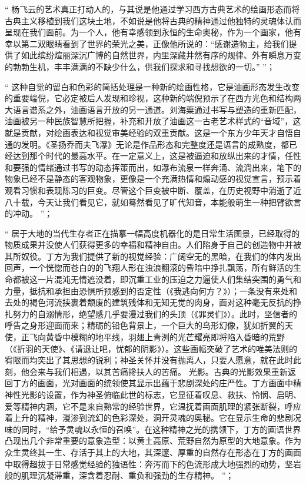 \documentclass[master,oneside]{zjuthesis}
\begin{document}
“ 杨飞云的艺术真正打动人的，与其说是他通过学习西方古典艺术的绘画形态而将古典主义移植到我们这块土地，不如说是他将古典的精神通过他独特的灵魂体认而呈现在我们面前。为一个人，他有幸感领到永恒的生命奥秘，作为一个画家，他有幸以第二双眼睛看到了世界的荣光之美，正像他所说的：“感谢造物主，给我们提供了如此缤纷煊丽深沉广博的自然世界，内里深藏井然有序的规律、外有瞬息万变的勃勃生机，丰丰满满的不缺少什么，供我们探求和寻找想欲的一切。” ”；

“ 这种自觉的留白和色彩的简括处理是一种新的绘画性格，它是油画形态发生改变的重要端倪，它必定被后人发现和珍视，这种新的端倪预示了在西方光色和结构两大语言谱系之外，油画语言开放的另一通道。刘海粟通过书写与塑造的重新匹配，油画被另一种民族智慧所把握，补充和开放了油画这一古老艺术样式的“音域”，这就是贡献，对绘画表达和视觉审美经验的双重贡献。这是一个东方少年天才自悟自通的发明。《圣扬乔而夫飞瀑》无论是作品形态和完整度还是语言的成熟度，都已经达到那个时代的最高水平。在一定意义上，这是被逼迫和放纵出来的才情，任性和要强的情绪通过书写的动态挥策而出，如瀑布流泉一样奔涌、流淌出来，笔下的物象已经不是静态的客观物象，更像是一个充满热情和煽动感的视觉宣言，预示着观看习惯和表现陈习的巨变。尽管这个巨变被中断、覆盖，在历史视野中消逝了近八十载，今天让我们看见它，就如蓦然看见了旷代知音，本能般萌生一种把臂欲言的冲动。 ”；

“ 居于大地的当代生存者正在描摹一幅高度机器化的是日常生活图景，已经取得的物质成果并没使人们获得更多的幸福和精神自由。人们陷身于自己的创造物中并被其所奴役。丁方为我们提供了新的视觉经验：广阔空无的黑暗，在我们的体内发出回声，一个恍惚而苍白的的飞翔人形在浊浪翻滚的昏暗中挣扎飘荡，所有鲜活的生命都被这一片混沌无情遮没着，即沉重工业的压迫之力逼使人们集结突围的勇气和力量，抵抗和承担由恐惧所预感到的否定性（《我逃向何方？》）；一条没有来处和去处的褐色河流挟裹着颓废的建筑残体和无知无觉的肉身，面对这种毫无反抗的挣扎努力的自溺情形，绝望感几乎要漫过我们的头顶（《罪灵们》）。此时，坚信者的呼告之身形迎面而来；精砺的铅色背景上，一个巨大的鸟形幻像，犹如折翼的天使，正飞向黄昏中模糊的地平线，羽翅上青洌的光芒耀亮即将陷入昏暗的荒野（《折羽的天使》、《请退让吧，忧郁的阴影》）。这些画幅突破了艺术的唯美法则的宥限而均突出了其思想的锐利；神圣关怀并没有抛离人，只要人愿意，就在此时此刻，他会来与我们相遇，以其苦痛搀扶人的苦痛。 光影。古典的光影效果重新返回丁方的画面，光对画面的统领使其显示出蕴于悲剧深处的庄严性。丁方画面中精神性光影的设置，作为神圣俯临此世的标志，它显征着叹息、救扶、怜悯、启明、爱等精神内涵，它不是来自熟常的经验世界，它温抚着画面肌理的紧张断裂，呼应着上升的精神，漫渗到流幻的色彩深处，洞开灵魂的奥秘。它在显示生命的悲剧况味的同时，“给予灵魂以永恒的召唤”。在这种精神之光的携领下，丁方的画语世界凸现出几个非常重要的意象造型：以黄土高原、荒野自然为原型的大地意象。作为众生灵终其一生、存活于其上的大地，其深邃、厚重的自然存在形态在丁方的画面中取得超拔于日常感觉经验的独语性：奔泻而下的色流形成大地强烈的动势，坚岩般的肌理沉凝滞重，深含着忍耐、重负和强劲的生存精神。 ”；
\end{document}
